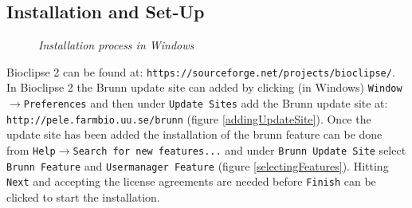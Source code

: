 \documentclass[a4paper,10pt]{article}
\begin{document}
         \subsection{Installation and Set-Up}

         \begin{figure}
           \caption{\textit{Installation process in Windows}} 
         \end{figure}

            Bioclipse 2 can be found at:
            \texttt{https://sourceforge.net/projects/bioclipse/}. In Bioclipse
            2 the Brunn update site can added by clicking (in Windows)
            \texttt{Window$\rightarrow$Preferences} and then under
            \texttt{Update Sites} add the Brunn update site at:
            \texttt{http://pele.farmbio.uu.se/brunn} (figure
            \ref{addingUpdateSite}). Once the update site has been added the
            installation of the brunn feature can be done from
            \texttt{Help$\rightarrow$Search for new features...} and under
            \texttt{Brunn Update Site} select \texttt{Brunn Feature} and
            \texttt{Usermanager Feature} (figure \ref{selectingFeatures}). Hitting
            \texttt{Next} and accepting the license agreements are needed
            before \texttt{Finish} can be clicked to start the installation. 
\end{document}
